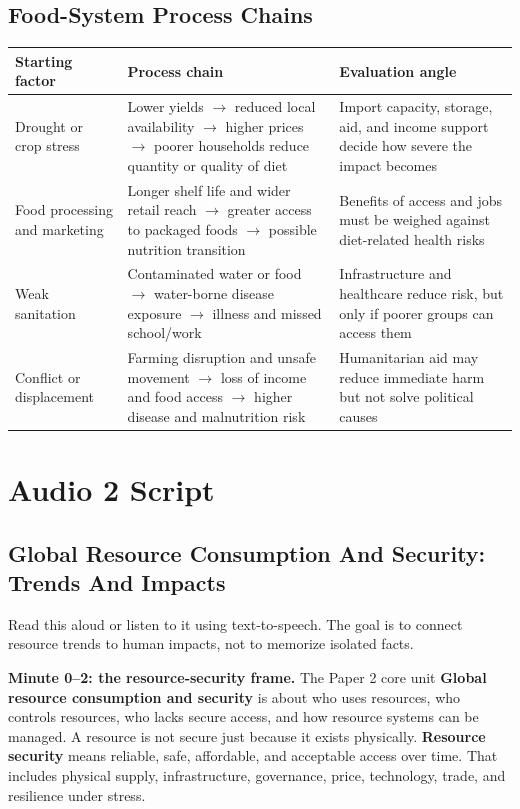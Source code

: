 \documentclass[11pt,a4paper]{article}
\newcommand{\term}[1]{\textcolor{HeadingBlue}{\textbf{#1}}}
\begin{document}
\subsection{Food-System Process Chains}

\begin{tabularx}{\textwidth}{L{0.18\textwidth}Y Y}
\toprule
\textbf{Starting factor} & \textbf{Process chain} & \textbf{Evaluation angle} \\
\midrule
Drought or crop stress & Lower yields $\rightarrow$ reduced local availability
$\rightarrow$ higher prices $\rightarrow$ poorer households reduce quantity or
quality of diet & Import capacity, storage, aid, and income support decide how
severe the impact becomes \\
Food processing and marketing & Longer shelf life and wider retail reach
$\rightarrow$ greater access to packaged foods $\rightarrow$ possible nutrition
transition & Benefits of access and jobs must be weighed against diet-related
health risks \\
Weak sanitation & Contaminated water or food $\rightarrow$ water-borne disease
exposure $\rightarrow$ illness and missed school/work & Infrastructure and
healthcare reduce risk, but only if poorer groups can access them \\
Conflict or displacement & Farming disruption and unsafe movement $\rightarrow$
loss of income and food access $\rightarrow$ higher disease and malnutrition
risk & Humanitarian aid may reduce immediate harm but not solve political
causes \\
\bottomrule
\end{tabularx}

\section{Audio 2 Script}

\subsection{Global Resource Consumption And Security: Trends And Impacts}

Read this aloud or listen to it using text-to-speech. The goal is to connect
resource trends to human impacts, not to memorize isolated facts.

\textbf{Minute 0--2: the resource-security frame.}
The Paper 2 core unit \term{Global resource consumption and security} is about
who uses resources, who controls resources, who lacks secure access, and how
resource systems can be managed. A resource is not secure just because it exists
physically. \term{Resource security} means reliable, safe, affordable, and
acceptable access over time. That includes physical supply, infrastructure,
governance, price, technology, trade, and resilience under stress.
\end{document}
